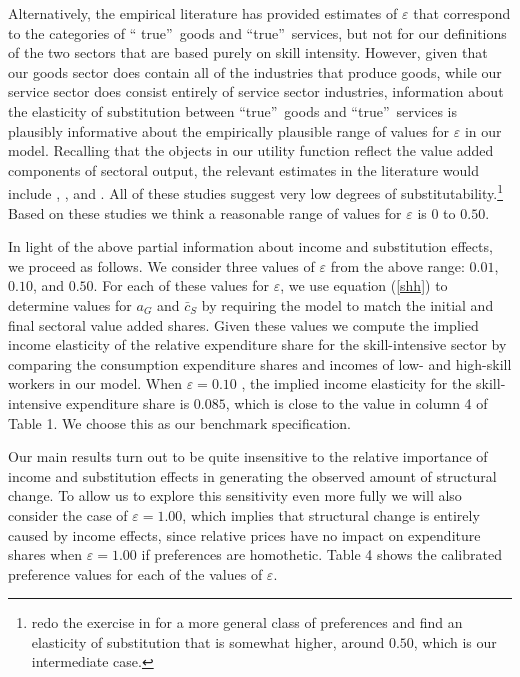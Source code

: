 \documentclass[12pt,english]{article}
\begin{document}
{\normalsize Alternatively, the empirical literature has provided estimates
of $\varepsilon $ that correspond to the categories of \textquotedblleft
true\textquotedblright\ goods and \textquotedblleft true\textquotedblright\
services, but not for our definitions of the two sectors that are based
purely on skill intensity. However, given that our goods sector does contain
all of the industries that produce goods, while our service sector does
consist entirely of service sector industries, information about the
elasticity of substitution between \textquotedblleft true\textquotedblright\
goods and \textquotedblleft true\textquotedblright\ services is plausibly
informative about the empirically plausible range of values for $\varepsilon 
$ in our model. Recalling that the objects in our utility function reflect
the value added components of sectoral output, the relevant estimates in the
literature would include \citet{HRV13}, \citet{BueKab09}, and \citet{Swi14}.
All of these studies suggest very low degrees of substitutability.\footnote{%
\citet{CLM15} redo the exercise in \citet{HRV13} for a more general class of
preferences and find an elasticity of substitution that is somewhat higher,
around $0.50$, which is our intermediate case.} Based on these studies we
think a reasonable range of values for $\varepsilon $ is $0$ to $0.50$. }

{\normalsize In light of the above partial information about income and
substitution effects, we proceed as follows. We consider three values of $%
\varepsilon $ from the above range: $0.01$, $0.10$, and $0.50$. For each of
these values for $\varepsilon $, we use equation (\ref{shh}) to determine
values for $a_{G}$ and $\bar{c}_{S}$ by requiring the model to match the
initial and final sectoral value added shares. Given these values we compute
the implied income elasticity of the relative expenditure share for the
skill-intensive sector by comparing the consumption expenditure shares and
incomes of low- and high-skill workers in our model. When $\varepsilon =0.10$%
, the implied income elasticity for the skill-intensive expenditure share is 
$0.085$, which is close to the value in column 4 of Table 1. We choose this
as our benchmark specification. }

{\normalsize Our main results turn out to be quite insensitive to the
relative importance of income and substitution effects in generating the
observed amount of structural change. To allow us to explore this
sensitivity even more fully we will also consider the case of $\varepsilon
=1.00$, which implies that structural change is entirely caused by income
effects, since relative prices have no impact on expenditure shares when $%
\varepsilon =1.00$ if preferences are homothetic. Table 4 shows the
calibrated preference values for each of the values of $\varepsilon $. }
\end{document}
